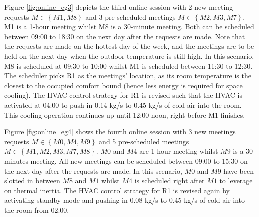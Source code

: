 Figure \ref{fig:online_eg3} depicts the third online session with 2 new meeting requests $M \in \left\{M1, M8\right\}$ and 3 pre-scheduled meetings $M \in \left\{M2, M3, M7\right\}$. M1 is a 1-hour meeting whilst M8 is a 30-minute meeting. Both can be scheduled between 09:00 to 18:30 on the next day after the requests are made. Note that the requests are made on the hottest day of the week, and the meetings are to be held on the next day when the outdoor temperature is still high. In this scenario, M8 is scheduled at 09:30 to 10:00 whilst M1 is scheduled between 11:30 to 12:30. The scheduler picks R1 as the meetings' location, as its room temperature is the closest to the occupied comfort bound (hence less energy is required for space cooling). The HVAC control strategy for R1 is revised such that the HVAC is activated at 04:00 to push in 0.14 \mbox{kg/s} to 0.45 \mbox{kg/s} of cold air into the room. This cooling operation continues up until 12:00 noon, right before M1 finishes. %

Figure \ref{fig:online_eg4} shows the fourth online session with 3 new meetings requests $M \in \left\{M0, M4, M9\right\}$ and 5 pre-scheduled meetings $M \in \left\{M1, M2, M3, M7, M8\right\}$. $M0$ and $M4$ are 1-hour meeting whilst $M9$ is a 30-minutes meeting. All new meetings can be scheduled between 09:00 to 15:30 on the next day after the requests are made. In this scenario, $M0$ and $M9$ have been slotted in between $M8$ and $M1$ whilst $M4$ is scheduled right after $M1$ to leverage on thermal inertia. The HVAC control strategy for R1 is revised again by activating standby-mode and pushing in 0.08 \mbox{kg/s} to 0.45 \mbox{kg/s} of cold air into the room from 02:00.

